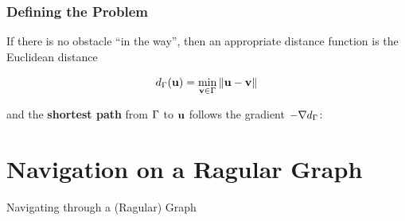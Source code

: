 \documentclass[aspectratio=169,handout]{beamer}
\begin{document}
\begin{frame}
	\frametitle{Defining the Problem}
	If there is no obstacle ``in the way'', then an appropriate distance function is the Euclidean distance
	
	$$d_{\Gamma}(\mathbf{u}) = \min_{\mathbf{v} \in \Gamma} \Vert \mathbf{u} - \mathbf{v}\Vert$$
	
	 and the \textbf{shortest path} from $\Gamma$ to $\mathbf{u}$ follows the gradient $-\nabla d_{\Gamma}$:
	\begin{figure}
		\hfill
	\end{figure}
\end{frame}

\section{Navigation on a Ragular Graph}
\begin{frame}[plain]
	\begin{center}
		{\color{myblue} \huge Navigating through a (Ragular) Graph}
	\end{center}
\end{frame}
\end{document}
